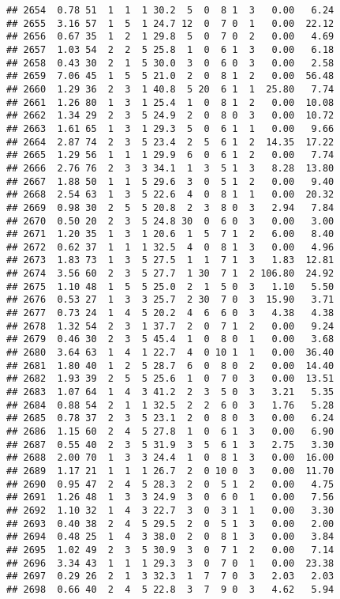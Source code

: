 \documentclass[
]{article}
\begin{document}
\begin{verbatim}
## 2654  0.78 51  1  1  1 30.2  5  0  8 1  3   0.00   6.24
## 2655  3.16 57  1  5  1 24.7 12  0  7 0  1   0.00  22.12
## 2656  0.67 35  1  2  1 29.8  5  0  7 0  2   0.00   4.69
## 2657  1.03 54  2  2  5 25.8  1  0  6 1  3   0.00   6.18
## 2658  0.43 30  2  1  5 30.0  3  0  6 0  3   0.00   2.58
## 2659  7.06 45  1  5  5 21.0  2  0  8 1  2   0.00  56.48
## 2660  1.29 36  2  3  1 40.8  5 20  6 1  1  25.80   7.74
## 2661  1.26 80  1  3  1 25.4  1  0  8 1  2   0.00  10.08
## 2662  1.34 29  2  3  5 24.9  2  0  8 0  3   0.00  10.72
## 2663  1.61 65  1  3  1 29.3  5  0  6 1  1   0.00   9.66
## 2664  2.87 74  2  3  5 23.4  2  5  6 1  2  14.35  17.22
## 2665  1.29 56  1  1  1 29.9  6  0  6 1  2   0.00   7.74
## 2666  2.76 76  2  3  3 34.1  1  3  5 1  3   8.28  13.80
## 2667  1.88 50  1  1  5 29.6  3  0  5 1  2   0.00   9.40
## 2668  2.54 63  1  3  5 22.6  4  0  8 1  1   0.00  20.32
## 2669  0.98 30  2  5  5 20.8  2  3  8 0  3   2.94   7.84
## 2670  0.50 20  2  3  5 24.8 30  0  6 0  3   0.00   3.00
## 2671  1.20 35  1  3  1 20.6  1  5  7 1  2   6.00   8.40
## 2672  0.62 37  1  1  1 32.5  4  0  8 1  3   0.00   4.96
## 2673  1.83 73  1  3  5 27.5  1  1  7 1  3   1.83  12.81
## 2674  3.56 60  2  3  5 27.7  1 30  7 1  2 106.80  24.92
## 2675  1.10 48  1  5  5 25.0  2  1  5 0  3   1.10   5.50
## 2676  0.53 27  1  3  3 25.7  2 30  7 0  3  15.90   3.71
## 2677  0.73 24  1  4  5 20.2  4  6  6 0  3   4.38   4.38
## 2678  1.32 54  2  3  1 37.7  2  0  7 1  2   0.00   9.24
## 2679  0.46 30  2  3  5 45.4  1  0  8 0  1   0.00   3.68
## 2680  3.64 63  1  4  1 22.7  4  0 10 1  1   0.00  36.40
## 2681  1.80 40  1  2  5 28.7  6  0  8 0  2   0.00  14.40
## 2682  1.93 39  2  5  5 25.6  1  0  7 0  3   0.00  13.51
## 2683  1.07 64  1  4  3 41.2  2  3  5 0  3   3.21   5.35
## 2684  0.88 54  2  1  1 32.5  2  2  6 0  3   1.76   5.28
## 2685  0.78 37  2  3  5 23.1  2  0  8 0  3   0.00   6.24
## 2686  1.15 60  2  4  5 27.8  1  0  6 1  3   0.00   6.90
## 2687  0.55 40  2  3  5 31.9  3  5  6 1  3   2.75   3.30
## 2688  2.00 70  1  3  3 24.4  1  0  8 1  3   0.00  16.00
## 2689  1.17 21  1  1  1 26.7  2  0 10 0  3   0.00  11.70
## 2690  0.95 47  2  4  5 28.3  2  0  5 1  2   0.00   4.75
## 2691  1.26 48  1  3  3 24.9  3  0  6 0  1   0.00   7.56
## 2692  1.10 32  1  4  3 22.7  3  0  3 1  1   0.00   3.30
## 2693  0.40 38  2  4  5 29.5  2  0  5 1  3   0.00   2.00
## 2694  0.48 25  1  4  3 38.0  2  0  8 1  3   0.00   3.84
## 2695  1.02 49  2  3  5 30.9  3  0  7 1  2   0.00   7.14
## 2696  3.34 43  1  1  1 29.3  3  0  7 0  1   0.00  23.38
## 2697  0.29 26  2  1  3 32.3  1  7  7 0  3   2.03   2.03
## 2698  0.66 40  2  4  5 22.8  3  7  9 0  3   4.62   5.94

\end{verbatim}
\end{document}
